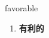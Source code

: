 
\begin{frame}
{\huge favorable}
\begin{center}
\begin{enumerate}\Large
  \item \textbf{有利的}
\end{enumerate}
\end{center}
\end{frame}
